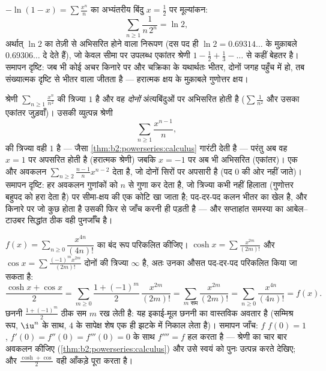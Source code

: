 \begin{example}[चक्रिका के भीतर से परिकलित एक लघुगणक]\label{ex:b2:powerseries:lntwo}
$-\ln(1-x) = \sum\frac{x^n}{n}$ का अभ्यंतरीय बिंदु $x = \frac12$ पर मूल्यांकन:
\[
\sum_{n\geq1}\frac{1}{n\,2^n} = \ln 2 ,
\]
अर्थात् $\ln 2$ का तेज़ी से अभिसरित होने वाला निरूपण (दस पद ही $\ln 2 = 0.69314\ldots$ के मुक़ाबले
$0.69306\ldots$ दे देते हैं), जो केवल सीमा पर उपलब्ध एकांतर श्रेणी $1 - \frac12 + \frac13 -
\dots$ से कहीं बेहतर
है। समापन दृष्टि: जब भी कोई अचर किनारे पर और चक्रिका के यथार्थतः भीतर,
दोनों जगह पहुँच में हो, तब संख्यात्मक दृष्टि से भीतर वाला जीतता है ---
हरात्मक क्षय के मुक़ाबले गुणोत्तर क्षय।
\end{example}

\begin{example}[अवकलन त्रिज्या बचाता है, सीमा नहीं]\label{ex:b2:powerseries:boundaryloss}
श्रेणी $\sum_{n\geq1}\frac{x^n}{n^2}$ की त्रिज्या $1$ है और वह \emph{दोनों} अंत्यबिंदुओं पर अभिसरित
होती है ($\sum\frac1{n^2}$ और उसका एकांतर जुड़वाँ)। उसकी व्युत्पन्न श्रेणी
\[
\sum_{n\geq1}\frac{x^{n-1}}{n} ,
\]
की त्रिज्या वही $1$ है --- जैसा \cref{thm:b2:powerseries:calculus} गारंटी देती है --- परंतु अब वह $x = 1$ पर
अपसरित होती है (हरात्मक श्रेणी) जबकि $x = -1$ पर अब भी अभिसरित (एकांतर)। एक और
अवकलन $\sum_{n\geq2}\frac{n-1}{n}x^{n-2}$ देता है, जो दोनों सिरों पर अपसारी है (पद $0$ की ओर नहीं जाते)।
समापन दृष्टि: हर अवकलन गुणांकों को $n$ से गुणा कर देता है, जो त्रिज्या
कभी नहीं हिलाता (गुणोत्तर बहुपद को हरा देता है) पर सीमा-क्षय की एक कोटि खा
जाता है; पद-दर-पद कलन भीतर का खेल है, और किनारे पर जो कुछ होता है उसकी फिर
से जाँच करनी ही पड़ती है --- और सप्ताहांत समस्या का आबेल--टाउबर सिद्धांत
ठीक वही पुनर्जाँच है।
\end{example}

\begin{example}[शेषों के अनुसार श्रेणी को बाँटना --- अंत तक किया हुआ]\label{ex:b2:powerseries:quarter}
$f(x) = \sum_{n\geq0} \dfrac{x^{4n}}{(4n)!}$ का बंद रूप परिकलित कीजिए। $\cosh x = \sum \frac{x^{2m}}{(2m)!}$ और $\cos x =
\sum \frac{(-1)^m x^{2m}}{(2m)!}$ दोनों की त्रिज्या $\infty$ है, अतः
उनका औसत पद-दर-पद परिकलित किया जा सकता है:
\[
\frac{\cosh x + \cos x}{2}
= \sum_{m\geq0}\frac{1 + (-1)^m}{2}\,\frac{x^{2m}}{(2m)!}
= \sum_{m \text{ सम}}\frac{x^{2m}}{(2m)!}
= \sum_{n\geq0}\frac{x^{4n}}{(4n)!} = f(x) .
\]
छननी $\frac{1+(-1)^m}{2}$ ठीक सम $m$ रख लेती है: यह इकाई-मूल छननी का वास्तविक अवतार है
(सम्मिश्र रूप, $\iu^n$ के साथ, $4$ के सापेक्ष शेष एक ही झटके में निकाल लेता
है)। समापन जाँच: $f$ $f(0) = 1$, $f'(0) = f''(0) = f'''(0) = 0$ के साथ $f'''' = f$ हल करता है --- श्रेणी का चार
बार अवकलन कीजिए (\cref{thm:b2:powerseries:calculus}) और उसे स्वयं को पुनः उत्पन्न करते देखिए; और $\frac{\cosh + \cos}{2}$
वही आँकड़े पूरा करता है।
\end{example}

